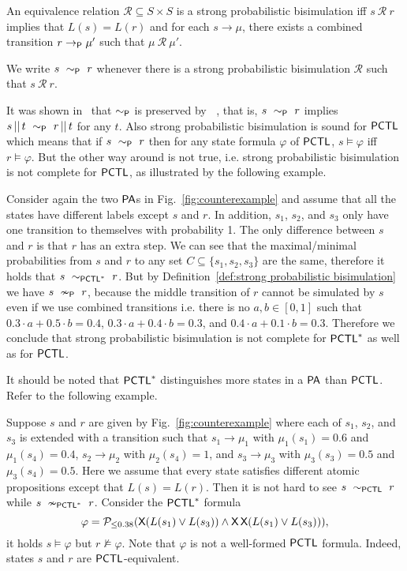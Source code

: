 \documentclass{LMCS}
\def\phi{\varphi}
\DeclareMathOperator{\interleave}{||}
\DeclareMathOperator{\X}{\text{\sf X}}
\newcommand{\TRAN}[2]{#1\rightarrow #2}
\newcommand{\TRANP}[2]{#1\rightarrow_{{\sf P}}#2}
\newcommand{\BSP}{\ensuremath{\sim_{{\sf P}}}}
\newcommand{\nBSP}{\ensuremath{\nsim_{{\sf P}}}}
\newcommand{\PA}{{\sf PA}}
\newcommand{\PCTL}{{\sf PCTL}}
\newcommand{\EPCTL}{\sim_{\PCTL}}
\newcommand{\EPCTLS}{\sim_{\PCTL^{*}}}
\newcommand{\nEPCTLS}{\nsim_{\PCTL^{*}}}
\newcommand{\MC}[1]{\mathcal{#1}}
\begin{document}
\begin{defi}\label{def:strong probabilistic bisimulation}
An equivalence relation $\MC{R}\subseteq S\times S$ is a strong
probabilistic bisimulation iff $s~\MC{R}~r$ implies that $L(s)=L(r)$ and for each $\TRAN{s}{\mu}$, there exists a combined transition
$\TRANP{r}{\mu'}$ such that $\mu~\MC{R}~\mu'$.

We write $s~\BSP~r$ whenever there is a strong
probabilistic bisimulation $\MC{R}$ such that $s~\MC{R}~r$.
\end{defi}

It was shown in~\cite{SegalaL95} that $\BSP$ is preserved by $\interleave$, that is, $s~\BSP~r$ implies $s\interleave t~\BSP~r\interleave t$ for any $t$. Also strong probabilistic bisimulation is sound for $\PCTL$ which means that if $s\ \BSP\ r$ then for any state formula $\phi$ of $\PCTL$, $s\models \phi$
iff $r\models \phi$. But the other way around is not true, i.e.
strong probabilistic bisimulation is not complete for $\PCTL$, as illustrated by
the following example.
\begin{exa}\label{ex:counterexample}
  Consider again the two $\PA$s in Fig.~\ref{fig:counterexample} and
  assume that all the states have different labels except $s$ and
  $r$. In addition, $s_1$, $s_2$, and $s_3$ only
  have one transition to themselves with probability 1.  The only
  difference between $s$ and $r$ is that $r$ has an extra step. We can see that the maximal/minimal
  probabilities from $s$ and $r$ to any set $C\subseteq \{s_1,s_2,s_3\}$
  are the same, therefore it holds that
  $s~\EPCTLS~r$. But by Definition~\ref{def:strong probabilistic
    bisimulation} we have $s~\nBSP~r$, because the middle transition
  of $r$ cannot be simulated by $s$ even if we use combined transitions
  i.e. there is no $a,b\in[0,1]$ such that $0.3\cdot a+0.5\cdot
  b=0.4$, $0.3\cdot a + 0.4\cdot b=0.3$, and $0.4\cdot a + 0.1\cdot b
  = 0.3$. Therefore we conclude that strong probabilistic bisimulation
  is not complete for $\PCTL^{*}$ as well as for $\PCTL$.
\end{exa}

It should be noted that $\PCTL^{*}$ distinguishes more states in a $\PA$ than $\PCTL$. Refer to the following example.
\begin{exa}\label{ex:pclt and pclt star}
  Suppose $s$ and $r$ are given by Fig.~\ref{fig:counterexample} where
  each of $s_1$, $s_2$, and $s_3$ is extended with a transition such
  that $\TRAN{s_1}{\mu_1}$ with $\mu_1(s_1)=0.6$ and $\mu_1(s_4)=0.4$,
  $\TRAN{s_2}{\mu_2}$ with $\mu_2(s_4)=1$, and $\TRAN{s_3}{\mu_3}$
  with $\mu_3(s_3)=0.5$ and $\mu_3(s_4)=0.5$. Here we assume that every state satisfies
  different atomic propositions except that $L(s)=L(r)$. Then it is not hard to
  see $s~\EPCTL~r$ while $s~\nEPCTLS~r$. Consider
the $\PCTL^{*}$  formula  $$\phi=\MC{P}_{\leq0.38}(\X(L(s_1)\lor
  L(s_3))\land\X\X(L(s_1)\lor L(s_3))),$$ it holds $s\models\phi$ but $r\not\models\phi$. Note that $\phi$ is not a
  well-formed $\PCTL$ formula. Indeed, states $s$ and $r$ are $\PCTL$-equivalent.
\end{exa}
\end{document}
